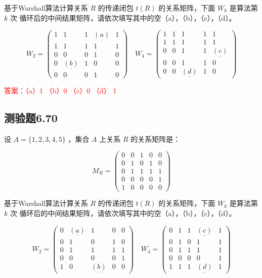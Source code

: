 \documentclass[UTF8, heading=true]{ctexart}
\begin{document}
基于Warshall算法计算关系 $R$ 的传递闭包 $t(R)$ 的关系矩阵，下面 $W_k$ 是算法第 $k$ 次
循环后的中间结果矩阵，请依次填写其中的空（a），（b），（c），（d）。

$$W_2=\left(\begin{array}{ccccc}1 & 1 & 1 & \underline{(a)} & 1 \\ 1 & 1 & 1 & 1 & 1 \\ 0 & 0 & 0 & 1 & 0 \\ 0 & \underline{(b)} & 1 & 0 & 0 \\ 0 & 0 & 0 & 1 & 0\end{array}\right) \quad W_4=\left(\begin{array}{ccccc}1 & 1 & 1 & 1 & 1 \\ 1 & 1 & 1 & 1 & 1 \\ 0 & 0 & 1 & 1 & \underline{(c)} \\ 0 & 0 & 1 & 1 & 0 \\ 0 & 0 & \underline{(d)} & 1 & 0\end{array}\right)$$

\textcolor{red}{答案：（a）1 （b）0 （c）0 （d） 1}




\subsection{测验题6.70}

设 $A=\{1,2,3,4,5\}$ ，集合 $A$ 上关系 $R$ 的关系矩阵是：

$$
M_R=\left(\begin{array}{lllll}
0 & 0 & 1 & 0 & 0 \\
0 & 1 & 0 & 1 & 0 \\
0 & 1 & 1 & 1 & 1 \\
0 & 0 & 0 & 0 & 1 \\
1 & 0 & 0 & 0 & 0
\end{array}\right)
$$

基于Warshall算法计算关系 $R$ 的传递闭包 $t(R)$ 的关系矩阵，下面 $W_k$ 是算法第 $k$ 次
循环后的中间结果矩阵，请依次填写其中的空（a），（b），（c），（d）。

$$
W_2=\left(\begin{array}{ccccc}
0 & \underline{(a)} & 1 & 0 & 0 \\
0 & 1 & 0 & 1 & 0 \\
0 & 1 & 1 & 1 & 1 \\
0 & 0 & 0 & 0 & 1 \\
1 & 0 & \underline{(b)} & 0 & 0
\end{array}\right) \quad W_4=\left(\begin{array}{ccccc}
0 & 1 & 1 & \underline{(c)} & 1 \\
0 & 1 & 0 & 1 & 1 \\
0 & 1 & 1 & 1 & 1 \\
0 & 0 & 0 & 0 & 1 \\
1 & 1 & 1 & \underline{(d)} & 1
\end{array}\right)
$$
\end{document}
